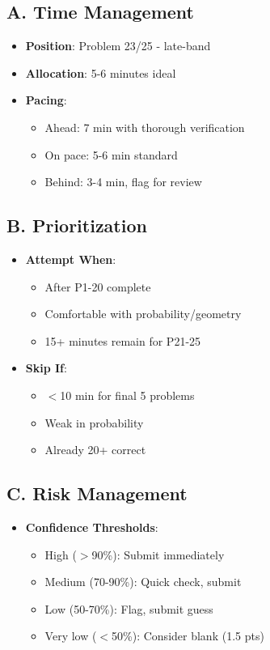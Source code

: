\documentclass[11pt]{article}
\begin{document}
\begin{competitionbox}
\subsection*{A. Time Management}
\begin{itemize}[leftmargin=*]
    \item \textbf{Position}: Problem 23/25 - late-band
    \item \textbf{Allocation}: 5-6 minutes ideal
    \item \textbf{Pacing}:
    \begin{itemize}
        \item Ahead: 7 min with thorough verification
        \item On pace: 5-6 min standard
        \item Behind: 3-4 min, flag for review
    \end{itemize}
\end{itemize}

\subsection*{B. Prioritization}
\begin{itemize}[leftmargin=*]
    \item \textbf{Attempt When}:
    \begin{itemize}
        \item After P1-20 complete
        \item Comfortable with probability/geometry
        \item 15+ minutes remain for P21-25
    \end{itemize}
    \item \textbf{Skip If}:
    \begin{itemize}
        \item $<$10 min for final 5 problems
        \item Weak in probability
        \item Already 20+ correct
    \end{itemize}
\end{itemize}

\subsection*{C. Risk Management}
\begin{itemize}[leftmargin=*]
    \item \textbf{Confidence Thresholds}:
    \begin{itemize}
        \item High ($>$90\%): Submit immediately
        \item Medium (70-90\%): Quick check, submit
        \item Low (50-70\%): Flag, submit guess
        \item Very low ($<$50\%): Consider blank (1.5 pts)
    \end{itemize}
    

\end{itemize}
\end{competitionbox}
\end{document}
